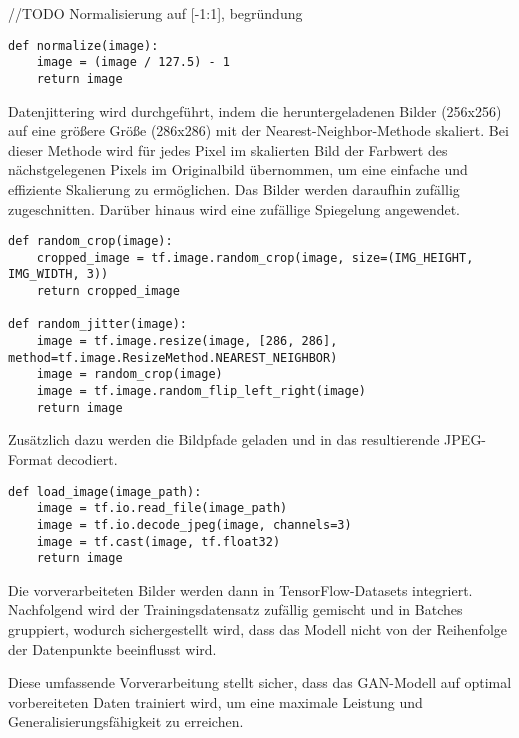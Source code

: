 //TODO Normalisierung auf [-1:1], begründung

\newpage
\begin{lstlisting}[language=pyhaff, caption={Vorverarbeitung des Datensatzes: Normalisierung}, label={cod:normalizing}]
def normalize(image):
    image = (image / 127.5) - 1
    return image
\end{lstlisting}

Datenjittering wird durchgeführt, indem die heruntergeladenen Bilder (256x256) auf eine größere Größe (286x286) mit der Nearest-Neighbor-Methode skaliert. Bei dieser Methode wird für jedes Pixel im skalierten Bild der Farbwert des nächstgelegenen Pixels im Originalbild übernommen, um eine einfache und effiziente Skalierung zu ermöglichen. Das Bilder werden daraufhin zufällig zugeschnitten. Darüber hinaus wird eine zufällige Spiegelung angewendet.

\begin{lstlisting}[language=pyhaff, caption={Vorverarbeitung des Datensatzes: Jittering}, label={cod:jittering}]
def random_crop(image):
    cropped_image = tf.image.random_crop(image, size=(IMG_HEIGHT, IMG_WIDTH, 3))
    return cropped_image

def random_jitter(image):
    image = tf.image.resize(image, [286, 286], method=tf.image.ResizeMethod.NEAREST_NEIGHBOR)
    image = random_crop(image)
    image = tf.image.random_flip_left_right(image)
    return image
\end{lstlisting}

Zusätzlich dazu werden die Bildpfade geladen und in das resultierende JPEG-Format decodiert.

\begin{lstlisting}[language=pyhaff, caption={Lesen eines Bildes}, label={cod:imageLoading}]
def load_image(image_path):
    image = tf.io.read_file(image_path)
    image = tf.io.decode_jpeg(image, channels=3)
    image = tf.cast(image, tf.float32)
    return image
\end{lstlisting}

Die vorverarbeiteten Bilder werden dann in TensorFlow-Datasets integriert. Nachfolgend wird der Trainingsdatensatz zufällig gemischt und in Batches gruppiert, wodurch sichergestellt wird, dass das Modell nicht von der Reihenfolge der Datenpunkte beeinflusst wird.
\newpage 


Diese umfassende Vorverarbeitung stellt sicher, dass das GAN-Modell auf optimal vorbereiteten Daten trainiert wird, um eine maximale Leistung und Generalisierungsfähigkeit zu erreichen.



